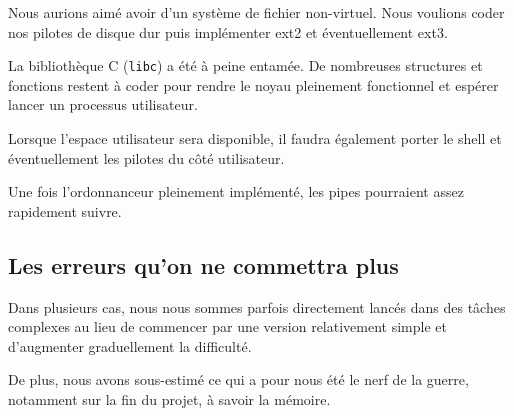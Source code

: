 \documentclass[a4paper, 11pt, twoside]{article}
\begin{document}
Nous aurions aimé avoir d'un système de fichier non-virtuel. Nous voulions coder
nos pilotes de disque dur puis implémenter ext2 et éventuellement ext3.

La bibliothèque C (\texttt{libc}) a été à peine entamée. De nombreuses
structures et fonctions restent à coder pour rendre le noyau pleinement
fonctionnel et espérer lancer un processus utilisateur.

Lorsque l'espace utilisateur sera disponible, il faudra également porter le
shell et éventuellement les pilotes du côté utilisateur.

Une fois l'ordonnanceur pleinement implémenté, les pipes pourraient assez 
rapidement suivre.

\subsection{Les erreurs qu'on ne commettra plus}

Dans plusieurs cas, nous nous sommes parfois directement lancés dans des tâches complexes
au lieu de commencer par une version relativement simple et d'augmenter graduellement la difficulté.

De plus, nous avons sous-estimé ce qui a pour nous été le nerf de la guerre, notamment
sur la fin du projet, à savoir la mémoire.
\end{document}
